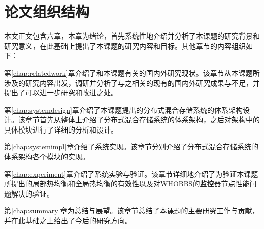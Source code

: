 \section{论文组织结构}
本文正文包含六章，本章为绪论，首先系统性地介绍并分析了本课题的研究背景和研究意义，在此基础上提出了本课题的研究内容和目标。其他章节的内容组织如下：

第\ref{chap:relatedwork}章介绍了和本课题有关的国内外研究现状。该章节从本课题所涉及的研究内容出发，调研并分析了与之相关的现有的国内外研究成果与不足，并提出了可以进一步研究和改进之处。

第\ref{chap:systemdesign}章介绍了本课题提出的分布式混合存储系统的体系架构设计。该章节首先从整体上介绍了分布式混合存储系统的体系架构，之后对架构中的具体模块进行了详细的分析和设计。

第\ref{chap:systemimpl}章介绍了系统实现。该章节分别介绍了分布式混合存储系统的体系架构各个模块的实现。

第\ref{chap:experiment}章介绍了系统实验与验证。该章节详细地介绍了为验证本课题所提出的局部热均衡和全局热均衡的有效性以及对WHOBBS的监控器节点性能问题解决的验证。

第\ref{chap:summary}章为总结与展望。该章节总结了本课题的主要研究工作与贡献，并在此基础之上给出了今后的研究方向。